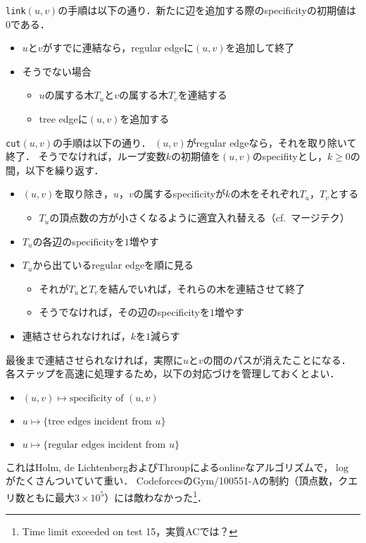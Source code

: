 \documentclass[a4paper]{jsarticle}
\begin{document}
\texttt{link}$(u, v)$の手順は以下の通り．新たに辺を追加する際のspecificityの初期値は$0$である．
\begin{itemize}
\item $u$と$v$がすでに連結なら，regular edgeに$(u, v)$を追加して終了
\item そうでない場合
  \begin{itemize}
  \item $u$の属する木$T_u$と$v$の属する木$T_v$を連結する
  \item tree edgeに$(u, v)$を追加する
  \end{itemize}
\end{itemize}
\texttt{cut}$(u, v)$の手順は以下の通り．
$(u, v)$がregular edgeなら，それを取り除いて終了．
そうでなければ，ループ変数$k$の初期値を$(u, v)$のspecifityとし，$k\ge 0$の間，以下を繰り返す．
\begin{itemize}
\item $(u, v)$を取り除き，$u$，$v$の属するspecificityが$k$の木をそれぞれ$T_u$，$T_v$とする
  \begin{itemize}
  \item $T_u$の頂点数の方が小さくなるように適宜入れ替える（cf.~マージテク）
  \end{itemize}
\item $T_u$の各辺のspecificityを$1$増やす
\item $T_u$から出ているregular edgeを順に見る
  \begin{itemize}
  \item それが$T_u$と$T_v$を結んでいれば，それらの木を連結させて終了
  \item そうでなければ，その辺のspecificityを$1$増やす
  \end{itemize}
\item 連結させられなければ，$k$を$1$減らす
\end{itemize}
最後まで連結させられなければ，実際に$u$と$v$の間のパスが消えたことになる．
各ステップを高速に処理するため，以下の対応づけを管理しておくとよい．
\begin{itemize}
\item $(u, v) \mapsto \text{specificity of }(u, v)$
\item $u \mapsto \{\text{tree edges incident from }u\}$
\item $u \mapsto \{\text{regular edges incident from }u\}$
\end{itemize}

これはHolm, de LichtenbergおよびThroupによるonlineなアルゴリズムで，$\log$がたくさんついていて重い．
CodeforcesのGym/100551-Aの制約（頂点数，クエリ数ともに最大$3\times 10^5$）には敵わなかった\footnote{Time limit exceeded on test 15，実質ACでは？}．
\end{document}
